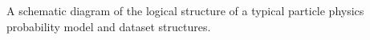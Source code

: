 A schematic diagram of the logical structure of a typical particle physics probability model and dataset structures.